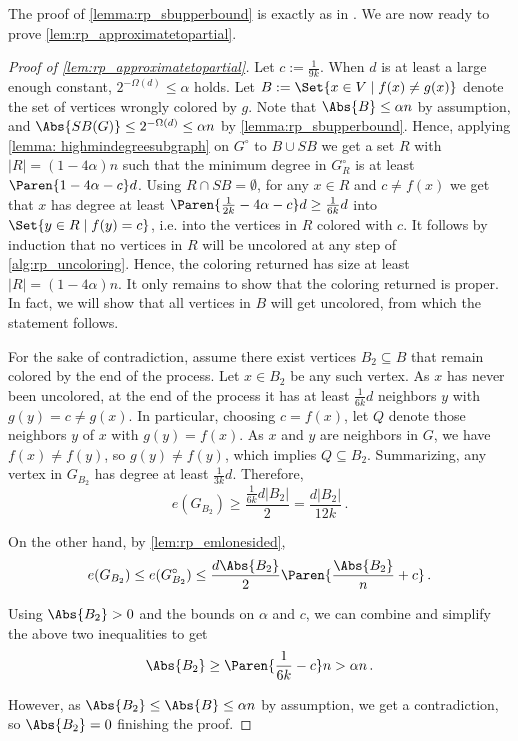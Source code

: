 
The proof of \cref{lemma:rp_sbupperbound} is exactly as in \cite{MR3536556-David16}. We are now ready to prove \cref{lem:rp_approximatetopartial}.

\begin{proof}[Proof of \cref{lem:rp_approximatetopartial}]
    Let $c:=\frac{1}{9k}$. When $d$ is at least a large enough constant, $2^{-\Omega(d)}\leq \alpha$ holds. Let $B:=\Set{x\in V\mid f(x)\neq g(x)}$ denote the set of vertices wrongly colored by $g$. Note that $\Abs{B}\leq \alpha n$ by assumption, and $\Abs{SB(G)}\leq 2^{-\Omega(d)}\leq \alpha n$ by \cref{lemma:rp_sbupperbound}. Hence, applying \cref{lemma: highmindegreesubgraph} on $G^{\circ}$ to $B\cup SB$ we get a set $R$ with $|R|=(1-4\alpha)n$ such that the minimum degree in $G_R^{\circ}$ is at least $\Paren{1-4\alpha-c}d$. Using $R\cap SB=\emptyset$, for any $x\in R$ and $c\neq f(x)$ we get that $x$ has degree at least $\Paren{\frac{1}{2k}-4\alpha-c}d\geq \frac{1}{6k}d$ into $\Set{y\in R\mid f(y)=c}$, i.e. into the vertices in $R$ colored with $c$. It follows by induction that no vertices in $R$ will be uncolored at any step of \cref{alg:rp_uncoloring}. Hence, the coloring returned has size at least $|R|=(1-4\alpha)n$. It only remains to show that the coloring returned is proper. In fact, we will show that all vertices in $B$ will get uncolored, from which the statement follows.

    For the sake of contradiction, assume there exist vertices $B_2\subseteq B$ that remain colored by the end of the process. Let $x\in B_2$ be any such vertex. As $x$ has never been uncolored, at the end of the process it has at least $\frac{1}{6k}d$ neighbors $y$ with $g(y)=c\neq g(x)$. In particular, choosing $c=f(x)$, let $Q$ denote those neighbors $y$ of $x$ with $g(y)=f(x)$. As $x$ and $y$ are neighbors in $G$, we have $f(x)\neq f(y)$, so $g(y)\neq f(y)$, which implies $Q\subseteq B_2$. Summarizing, any vertex in $G_{B_2}$ has degree at least $\frac{1}{3k}d$. Therefore, $$e(G_{B_2})\geq \frac{\frac{1}{6k}d|B_2|}{2}= \frac{d|B_2|}{12k}\,.$$

    On the other hand, by \cref{lem:rp_emlonesided}, $$e(G_{B_2})\leq e(G_{B_2}^{\circ})\leq \frac{d\Abs{B_2}}{2}\Paren{\frac{\Abs{B_2}}{n}+c}\,.$$
    
    Using $\Abs{B_2}>0$ and the bounds on $\alpha$ and $c$, we can combine and simplify the above two inequalities to get $$\Abs{B_2}\geq \Paren{\frac{1}{6k}-c}n> \alpha n\,.$$

    However, as $\Abs{B_2}\leq \Abs{B}\leq \alpha n$ by assumption, we get a contradiction, so $\Abs{B_2}=0$ finishing the proof.
\end{proof}

